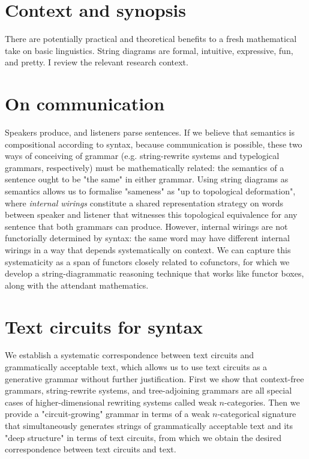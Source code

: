 \chapter{Context and synopsis}
There are potentially practical and theoretical benefits to a fresh mathematical take on basic linguistics. String diagrams are formal, intuitive, expressive, fun, and pretty. I review the relevant research context.
\clearpage
\newpage

\clearpage
\newpage

\clearpage
\newpage

\label{ch:oneandhalf}

\clearpage
\newpage

\chapter{On communication}\label{chapter:internalwirings}
Speakers produce, and listeners parse sentences. If we believe that semantics is compositional according to syntax, because communication is possible, these two ways of conceiving of grammar (e.g. string-rewrite systems and typelogical grammars, respectively) must be mathematically related: the semantics of a sentence ought to be "the same" in either grammar. Using string diagrams as semantics allows us to formalise "sameness" as "up to topological deformation", where \emph{internal wirings} constitute a shared representation strategy on words between speaker and listener that witnesses this topological equivalence for any sentence that both grammars can produce. However, internal wirings are not functorially determined by syntax: the same word may have different internal wirings in a way that depends systematically on context. We can capture this systematicity as a span of functors closely related to cofunctors, for which we develop a string-diagrammatic reasoning technique that works like functor boxes, along with the attendant mathematics.
\clearpage
\newpage


\chapter{Text circuits for syntax}\label{chapter:textcircuits}
We establish a systematic correspondence between text circuits and grammatically acceptable text, which allows us to use text circuits as a generative grammar without further justification. First we show that context-free grammars, string-rewrite systems, and tree-adjoining grammars are all special cases of higher-dimensional rewriting systems called weak $n$-categories. Then we provide a "circuit-growing" grammar in terms of a weak $n$-categorical signature that simultaneously generates strings of grammatically acceptable text and its "deep structure" in terms of text circuits, from which we obtain the desired correspondence between text circuits and text.
\clearpage
\newpage

\clearpage
\newpage

\clearpage
\newpage

\clearpage

